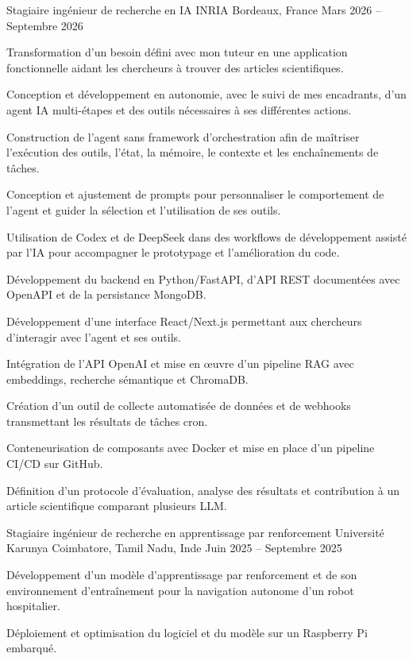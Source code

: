 
\begin{cventries}
  \cventry
    {Stagiaire ingénieur de recherche en IA}
    {INRIA}
    {Bordeaux, France}
    {Mars 2026 -- Septembre 2026}
    {
      \begin{cvitems}
        \item {Transformation d’un besoin défini avec mon tuteur en une application fonctionnelle aidant les chercheurs à trouver des articles scientifiques.}
        \item {Conception et développement en autonomie, avec le suivi de mes encadrants, d’un agent IA multi-étapes et des outils nécessaires à ses différentes actions.}
        \item {Construction de l’agent sans framework d’orchestration afin de maîtriser l’exécution des outils, l’état, la mémoire, le contexte et les enchaînements de tâches.}
        \item {Conception et ajustement de prompts pour personnaliser le comportement de l’agent et guider la sélection et l’utilisation de ses outils.}
        \item {Utilisation de Codex et de DeepSeek dans des workflows de développement assisté par l’IA pour accompagner le prototypage et l’amélioration du code.}
        \item {Développement du backend en Python/FastAPI, d’API REST documentées avec OpenAPI et de la persistance MongoDB.}
        \item {Développement d’une interface React/Next.js permettant aux chercheurs d’interagir avec l’agent et ses outils.}
        \item {Intégration de l’API OpenAI et mise en œuvre d’un pipeline RAG avec embeddings, recherche sémantique et ChromaDB.}
        \item {Création d’un outil de collecte automatisée de données et de webhooks transmettant les résultats de tâches cron.}
        \item {Conteneurisation de composants avec Docker et mise en place d’un pipeline CI/CD sur GitHub.}
        \item {Définition d’un protocole d’évaluation, analyse des résultats et contribution à un article scientifique comparant plusieurs LLM.}
      \end{cvitems}
    }

  \cventry
    {Stagiaire ingénieur de recherche en apprentissage par renforcement}
    {Université Karunya}
    {Coimbatore, Tamil Nadu, Inde}
    {Juin 2025 -- Septembre 2025}
    {
      \begin{cvitems}
        \item {Développement d’un modèle d’apprentissage par renforcement et de son environnement d’entraînement pour la navigation autonome d’un robot hospitalier.}
        \item {Déploiement et optimisation du logiciel et du modèle sur un Raspberry Pi embarqué.}
      \end{cvitems}
    }
\end{cventries}
